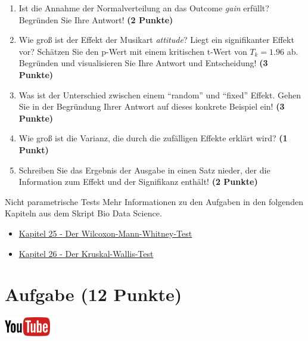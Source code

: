 \documentclass[a4paper, 10pt]{scrartcl}\usepackage[]{graphicx}\usepackage[]{xcolor}
\begin{document}
\begin{enumerate}
\item Ist die Annahme der Normalverteilung an das Outcome \textit{gain} erf{\"u}llt?
  Begr{\"u}nden Sie Ihre Antwort! \textbf{(2 Punkte)}
\item Wie gro{\ss} ist der Effekt der Musikart \textit{attitude}? Liegt ein signifikanter
  Effekt vor? Sch{\"a}tzen Sie den p-Wert mit einem kritischen t-Wert von $T_k
  = 1.96$ ab. Begr{\"u}nden und visualisieren Sie Ihre Antwort und
  Entscheidung! \textbf{(3 Punkte)}
\item Was ist der Unterschied zwischen einem "`random"' und "`fixed"'
  Effekt. Gehen Sie in der Begr{\"u}ndung Ihrer Antwort auf dieses konkrete
  Beispiel ein! \textbf{(3 Punkte)}
\item Wie gro{\ss} ist die Varianz, die durch die zuf{\"a}lligen Effekte erkl{\"a}rt wird? \textbf{(1 Punkt)}
\item Schreiben Sie das Ergebnis der \Rlogo Ausgabe in einen Satz nieder, der die
  Information zum Effekt und der Signifikanz enth{\"a}lt! \textbf{(2 Punkte)}
\end{enumerate}
 
\clearpage
\begin{graybox}{Nicht parametrische Tests}
Mehr Informationen zu den Aufgaben in den folgenden Kapiteln aus dem Skript Bio Data Science.
  \begin{itemize}
  \item \href{https://jkruppa.github.io/stat-tests-utest.html}{Kapitel 25 - Der Wilcoxon-Mann-Whitney-Test}
  \item \href{https://jkruppa.github.io/stat-tests-kruskal.html}{Kapitel 26 - Der Kruskal-Wallis-Test}
  \end{itemize}
\end{graybox}
\clearpage

\section{Aufgabe \hfill (12 Punkte)}

\hfill\href{https://youtu.be/ArHA6MZOEOw}{\includegraphics[width =
  2cm]{img/youtube}} %
\hspace{2Ex}
\end{document}
